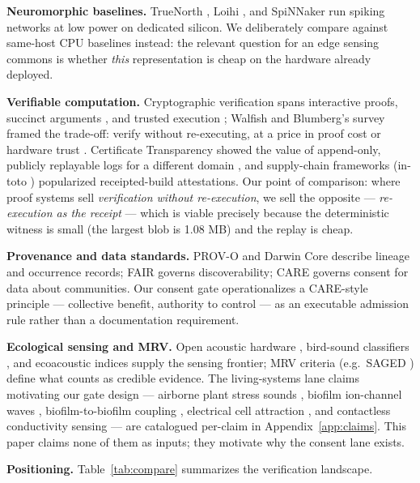 \documentclass[pdflatex,sn-basic]{sn-jnl}
\begin{document}
\textbf{Neuromorphic baselines.} TrueNorth \cite{merolla2014}, Loihi
\cite{davies2018}, and SpiNNaker \cite{furber2014} run spiking
networks at low power on dedicated silicon. We deliberately compare
against same-host CPU baselines instead: the relevant question for an
edge sensing commons is whether \emph{this} representation is cheap
on the hardware already deployed.

\textbf{Verifiable computation.} Cryptographic verification spans
interactive proofs, succinct arguments \cite{groth2016}, and
trusted execution \cite{costan2016}; Walfish and Blumberg's survey
framed the trade-off: verify without re-executing, at a price in
proof cost or hardware trust \cite{walfish2015}. Certificate
Transparency showed the value of append-only, publicly replayable
logs for a different domain \cite{laurie2014}, and supply-chain
frameworks (in-toto \cite{intoto2019}) popularized
receipted-build attestations. Our point of comparison:
where proof systems sell \emph{verification without re-execution},
we sell the opposite --- \emph{re-execution as the receipt} ---
which is viable precisely because the deterministic witness is
small (the largest blob is 1.08 MB) and the replay is cheap.

\textbf{Provenance and data standards.} PROV-O \cite{provo2013} and
Darwin Core \cite{wieczorek2012} describe lineage and occurrence
records; FAIR \cite{wilkinson2016} governs discoverability; CARE
\cite{carroll2020} governs consent for data about communities. Our
consent gate operationalizes a CARE-style principle --- collective
benefit, authority to control --- as an executable admission rule
rather than a documentation requirement.

\textbf{Ecological sensing and MRV.} Open acoustic hardware
\cite{hill2018,pearce2012}, bird-sound classifiers \cite{kahl2021},
and ecoacoustic indices \cite{sueur2015} supply the sensing frontier;
MRV criteria (e.g.\ SAGED \cite{ford2024}) define what counts as
credible evidence. The living-systems lane claims motivating our
gate design --- airborne plant stress sounds \cite{khait2023},
biofilm ion-channel waves \cite{prindle2015}, biofilm-to-biofilm
coupling \cite{liu2017}, electrical cell attraction
\cite{humphries2017}, and contactless conductivity sensing
\cite{kuban2009} --- are catalogued per-claim in
Appendix~\ref{app:claims}. This paper claims none of them as inputs;
they motivate why the consent lane exists.

\textbf{Positioning.} Table~\ref{tab:compare} summarizes the
verification landscape.
\end{document}
